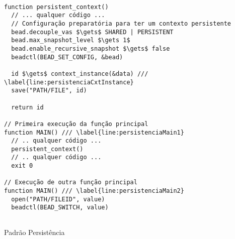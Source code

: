 \begin{pseudocode}
\begin{lstlisting}[language=pseudocode, style=pseudocode]

function persistent_context()
  // ... qualquer código ...
  // Configuração preparatória para ter um contexto persistente
  bead.decouple_vas $\gets$ SHARED | PERSISTENT
  bead.max_snapshot_level $\gets 1$
  bead.enable_recursive_snapshot $\gets$ false
  beadctl(BEAD_SET_CONFIG, &bead)

  id $\gets$ context_instance(&data) /// \label{line:persistenciaCxtInstance}
  save("PATH/FILE", id)

  return id

// Primeira execução da função principal
function MAIN() /// \label{line:persistenciaMain1}
  // .. qualquer código ...
  persistent_context()
  // .. qualquer código ...
  exit 0

// Execução de outra função principal
function MAIN() /// \label{line:persistenciaMain2}
  open("PATH/FILEID", value)
  beadctl(BEAD_SWITCH, value)
  
\end{lstlisting}

  \caption{Padrão Persistência}
  \label{alg:persistencia}
\end{pseudocode}
